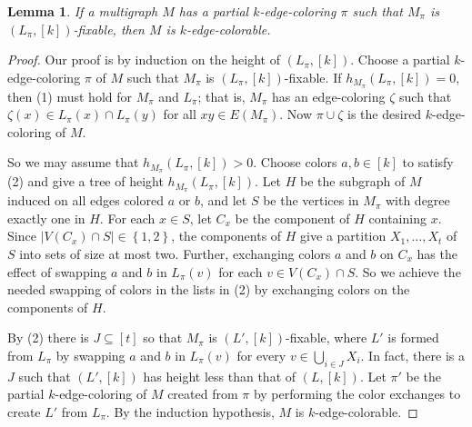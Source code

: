 \documentclass[12pt]{article}
\theoremstyle{plain}
\newtheorem{lem}[thm]{Lemma}
\theoremstyle{definition}
\theoremstyle{remark}
\newcommand{\set}[1]{\left\{ #1 \right\}}
\newcommand{\card}[1]{\left|#1\right|}
\newcommand{\irange}[1]{\left[#1\right]}
\newcommand{\parens}[1]{\left( #1 \right)}
\begin{document}
\begin{lem}\label{FixableCompletesColoring}
If a multigraph $M$ has a partial $k$-edge-coloring $\pi$ such that $M_\pi$ is $(L_\pi, \irange{k})$-fixable, then $M$ is $k$-edge-colorable.
\end{lem}
\begin{proof}
Our proof is by induction on the height of $(L_\pi,[k])$.
Choose a partial $k$-edge-coloring $\pi$ of $M$ such that $M_\pi$ is $(L_\pi,
\irange{k})$-fixable. %
If $h_{M_\pi}\parens{L_\pi, \irange{k}} = 0$, then (1) must hold for $M_\pi$
and $L_\pi$; that is, $M_\pi$ has an edge-coloring $\zeta$ such that $\zeta(x)
\in L_\pi(x) \cap L_\pi(y)$ for all $xy \in E(M_\pi)$.  Now 
$\pi \cup \zeta$ is the desired $k$-edge-coloring of $M$.  

So we may assume that $h_{M_\pi}\parens{L_\pi, \irange{k}} > 0$.  Choose colors
$a,b \in \irange{k}$ to satisfy (2) and give a tree of height
$h_{M_\pi}\parens{L_\pi, \irange{k}}$.  Let $H$ be the subgraph of $M$ induced
on all edges colored $a$ or $b$,
and let $S$ be the vertices in $M_\pi$ with degree exactly one in $H$.  
For each $x \in S$, let $C_x$ be the component of $H$ containing $x$.
Since $\card{V(C_x) \cap S} \in \set{1,2}$, the components of $H$ give a
partition $X_1, \ldots, X_t$ of $S$ into sets of size
at most two.  Further, exchanging colors $a$ and $b$ on $C_x$ has the effect
of swapping $a$ and $b$ in $L_\pi(v)$ for each $v \in V(C_x) \cap S$.  So we
achieve the needed swapping of colors in the lists in (2) by exchanging
colors on the components of $H$.  

By (2) there is $J \subseteq \irange{t}$ so
that $M_\pi$ is $(L', \irange{k})$-fixable, where $L'$ is formed from $L_\pi$ by
swapping $a$ and $b$ in $L_\pi(v)$ for every $v \in \bigcup_{i \in J} X_i$. 
In fact, there is a $J$ such that $(L',[k])$ has height less than that of
$(L,[k])$.
Let $\pi'$ be the partial $k$-edge-coloring of $M$ created from
$\pi$ by performing the color exchanges to create $L'$ from $L_\pi$.  
By the induction hypothesis, $M$ is $k$-edge-colorable.
\end{proof}
\end{document}
